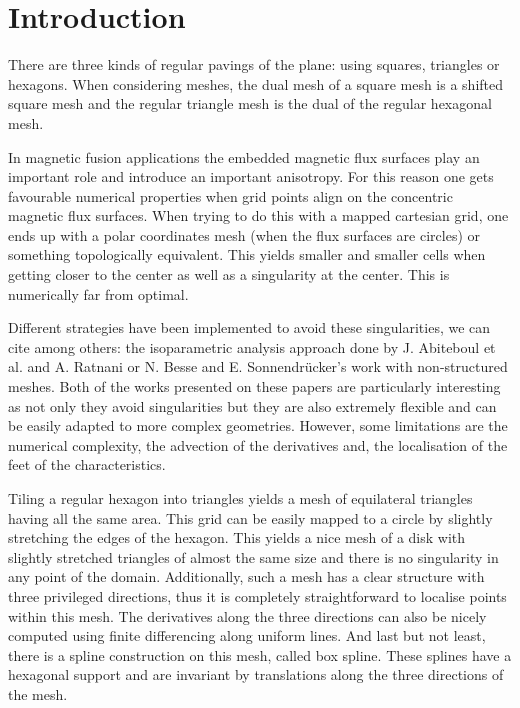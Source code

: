 \documentclass[proc]{edpsmath}
\begin{document}
\maketitle


\section*{Introduction}


There are three kinds of regular pavings of the plane: using squares, triangles or hexagons. When considering meshes, the dual mesh of a square mesh is a shifted square mesh and the regular triangle mesh is the dual of the regular hexagonal mesh.

In magnetic fusion applications the embedded magnetic flux surfaces play an important role and introduce an important anisotropy\cite{Angelino2009}. For this reason one gets favourable numerical properties when grid points align on the concentric magnetic flux surfaces. When trying to do this with a mapped cartesian grid, one ends up with a polar coordinates mesh (when the flux surfaces are circles) or something topologically equivalent. This yields smaller and smaller cells when getting closer to the center as well as a singularity at the center. This is numerically far from optimal. 

Different strategies have been implemented to avoid these singularities, we can cite among others: the isoparametric analysis approach done by J. Abiteboul et al. \cite{abiteboul2011solving} and A. Ratnani \cite{ratnani2011isogeometric} or N. Besse and E. Sonnendr\"{u}cker's work with non-structured meshes\cite{Besse2003341}. Both of the works presented on these papers are particularly interesting as not only they avoid singularities but they are also extremely flexible and can be easily adapted to more complex geometries. However, some limitations are the numerical complexity, the advection of the derivatives and, the localisation of the feet of the characteristics. 

Tiling a regular hexagon into triangles yields a mesh of equilateral triangles having all the same area. This grid can be easily mapped to a circle by slightly stretching the edges of the hexagon. This yields a nice mesh of a disk with slightly stretched triangles of almost the same size and there is no singularity in any point of the domain. 
Additionally, such a mesh has a clear structure with three privileged directions, thus it is completely straightforward to localise points within this mesh. The derivatives along the three directions can also be nicely computed using finite differencing along uniform lines. And last but not least, there is a spline construction on this mesh, called box spline. These splines have a hexagonal support and are invariant by translations along the three directions of the mesh. 
\end{document}

